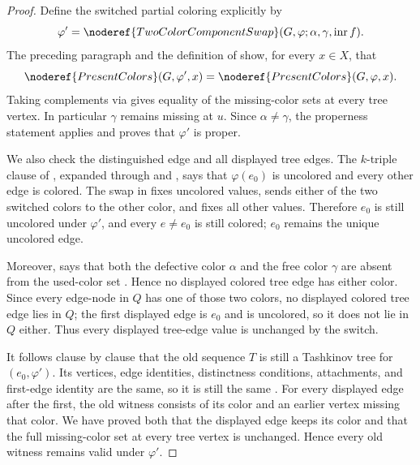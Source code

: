 \begin{proof}
Define the switched partial coloring explicitly by
\[
 \varphi'=\noderef{TwoColorComponentSwap}
   (G,\varphi;\alpha,\gamma,\operatorname{inr}f).
\]
The preceding paragraph and the definition of
 show, for every $x\in X$, that
\[
 \noderef{PresentColors}(G,\varphi',x)
   =\noderef{PresentColors}(G,\varphi,x).
\]
Taking complements via  gives equality of the
missing-color sets at every tree vertex.  In particular $\gamma$ remains
missing at $u$.  Since $\alpha\ne\gamma$, the properness statement
 applies and proves that $\varphi'$
is proper.

We also check the distinguished edge and all displayed tree edges.  The
$k$-triple clause of , expanded through
 and , says that
$\varphi(e_0)$ is uncolored and every other edge is colored.  The swap in
 fixes uncolored values, sends either of
the two switched colors to the other color, and fixes all other values.
Therefore $e_0$ is still uncolored under $\varphi'$, and every
$e\ne e_0$ is still colored; $e_0$ remains the unique uncolored edge.

Moreover,  says that both the
defective color $\alpha$ and the free color $\gamma$ are absent from the
used-color set .  Hence no displayed colored tree
edge has either color.  Since every edge-node in $Q$ has one of those two
colors, no displayed colored tree edge lies in $Q$; the first displayed
edge is $e_0$ and is uncolored, so it does not lie in $Q$ either.  Thus
every displayed tree-edge value is unchanged by the switch.

It follows clause by clause that the old sequence $T$ is still a
Tashkinov tree for $(e_0,\varphi')$.  Its vertices, edge identities,
distinctness conditions, attachments, and first-edge identity are the
same, so it is still the same .  For every displayed
edge after the first, the old  witness consists of
its color and an earlier vertex missing that color.  We have proved both
that the displayed edge keeps its color and that the full missing-color
set at every tree vertex is unchanged.  Hence every old witness remains
valid under $\varphi'$.


\end{proof}
